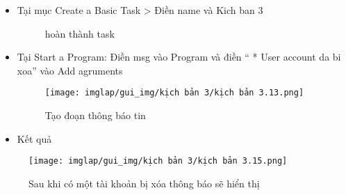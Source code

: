 \documentclass[13pt]{article}
\begin{document}
\begin{enumerate}
\begin{itemize}
\begin{itemize}
\newpage
                                \item Tại mục Create a Basic Task > Điền name và Kich ban 3
\begin{figure}[H]
 		\hfill
 		\hfill
 				\caption{hoàn thành task}
 				\label{fig:AD_p2}
 		\end{figure}
                                \item Tại Start a Program: Điền msg vào Program và điền “ * User account da bi xoa” vào Add agruments
\begin{figure}[H]
                                    \centering
                                    \texttt{[image: imglap/gui\_img/kịch bản 3/kịch bản 3.13.png]}
                                    \caption{Tạo đoạn thông báo tin}
                                    \label{fig:enter-label}
                                \end{figure}
\newpage
                                                                \item Kết quả
                                                                \end{itemize}
        \begin{figure}[H]
            \centering
            \texttt{[image: imglap/gui\_img/kịch bản 3/kịch bản 3.15.png]}
            \caption{Sau khi có một tài khoản bị xóa thông báo sẽ hiển thị}
            \label{fig:enter-label}
        \end{figure}
        
                \end{itemize}
        \end{enumerate}

        \newpage
\end{document}
